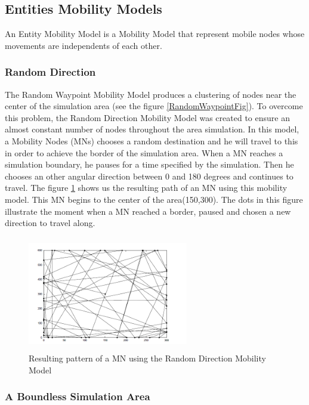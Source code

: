 
\subsection{Entities Mobility Models}

An Entity Mobility Model is a Mobility Model that represent mobile nodes whose movements are independents of each other.


\subsubsection{Random Direction}

The Random Waypoint Mobility Model produces a clustering of nodes near the center of the simulation area (see the figure \ref{RandomWaypointFig}). To overcome this problem, the Random Direction Mobility Model was created to ensure an almost constant number of nodes throughout the area simulation. 
In this model, a Mobility Nodes (MNs) chooses a random destination and he will travel to this in order to achieve the border of the simulation area. When a MN reaches a simulation boundary, he pauses for a time specified by the simulation. Then he chooses an other angular direction between 0 and 180 degrees and continues to travel. 
The figure \ref{RandomDirectionFig} shows us the resulting path of an MN using this mobility model. This MN begins to the center of the area(150,300). The dots in this figure illustrate the moment when a MN reached a border, paused and chosen a new direction to travel along.

\begin{figure}[h]
\center
\includegraphics[width=7cm,height=50mm]{../images/randomdirection1.png}
\caption{\label{RandomDirectionFig}Resulting pattern of a MN using the Random Direction Mobility Model}
\end{figure}

\subsubsection{A Boundless Simulation Area}

